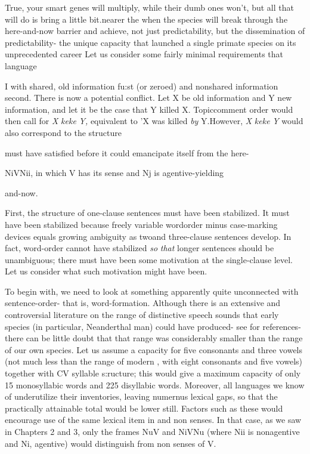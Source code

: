 True, your smart genes will multiply, while their dumb ones won't, but all that will do is bring a little bit.nearer the  when the species will break through the here-and-now barrier and achieve, not just
predictability, but the dissemination of predictability- the unique capacity that launched a single primate species on its unprecedented
career
Let us consider some fairly minimal requirements that language

I
with shared, old information fu:st (or zeroed) and nonshared informa\-tion second. There is now a potential conflict. Let X be old information and Y new information, and let it be the case that Y killed X. Topic\-comment order would then call for \textit{X} \textit{keke} \textit{Y,} equivalent to 'X was killed \textit{by} Y.However, \textit{X} \textit{keke} \textit{Y} would also correspond to the structure

must
have satisfied before it could emancipate itself from the here-

NiVNii, in which V has its  sense and Nj is agentive-yielding

and-now.

First, the structure of one-clause sentences must have been
stabilized. It must have been stabilized because freely variable word\-order minus case-marking devices equals growing ambiguity as two\-and three-clause sentences develop. In fact, word-order cannot have stabilized \textit{so} \textit{that} longer sentences should be unambiguous; there must have been some motivation at the single-clause level. Let us consider what such motivation might have been.

To begin with, we need to look at something apparently quite
unconnected with sentence-order- that is, word-formation. Although there is an extensive and controversial literature on the range of distinc\-tive speech sounds that early species (in particular, Neanderthal man) could have produced- see \citet{Spuhler1977} for references-there can be little doubt that that range was considerably smaller than the range of our own species. Let us assume a capacity for five consonants and three vowels (not much less than the range of modern , with eight consonants and five vowels) together with CV syllable s:ructure; this would give a maximum capacity of only 15 monosyllabic words and 225 disyllabic words. Moreover, all languages we know of under\-utilize their inventories, leaving numernus lexical gaps, so that the practically attainable total would be lower still. Factors such as these would encourage use of the same lexical item in  and non\- senses. In that case, as we saw in Chapters 2 and 3, only the frames NuV and NiVNu (where Nii is nonagentive and Ni, agentive) would distinguish  from non senses of V.


